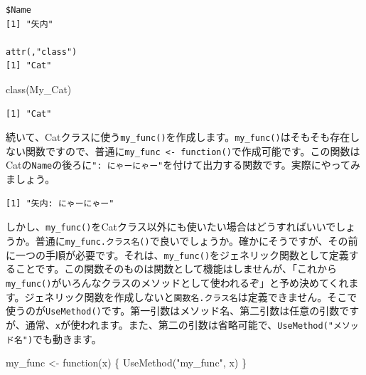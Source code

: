 \documentclass[
  a4paper,
  pandoc,
  ja=standard,
  jafont=haranoaji]{bxjsbook}
\newenvironment{Shaded}{\begin{snugshade}}{\end{snugshade}}
\newcommand{\ControlFlowTok}[1]{\textcolor[rgb]{0.00,0.48,0.65}{#1}}
\newcommand{\FunctionTok}[1]{\textcolor[rgb]{0.28,0.35,0.67}{#1}}
\newcommand{\NormalTok}[1]{\textcolor[rgb]{0.00,0.48,0.65}{#1}}
\newcommand{\OtherTok}[1]{\textcolor[rgb]{0.00,0.48,0.65}{#1}}
\newcommand{\SpecialCharTok}[1]{\textcolor[rgb]{0.37,0.37,0.37}{#1}}
\newcommand{\StringTok}[1]{\textcolor[rgb]{0.13,0.47,0.30}{#1}}
\begin{document}
\begin{verbatim}
$Name
[1] "矢内"

attr(,"class")
[1] "Cat"
\end{verbatim}

\begin{Shaded}
\begin{Highlighting}[numbers=left,,]
\FunctionTok{class}\NormalTok{(My\_Cat)}
\end{Highlighting}
\end{Shaded}

\begin{verbatim}
[1] "Cat"
\end{verbatim}

続いて、Catクラスに使う\texttt{my\_func()}を作成します。\texttt{my\_func()}はそもそも存在しない関数ですので、普通に\texttt{my\_func\ \textless{}-\ function()}で作成可能です。この関数はCatの\texttt{Name}の後ろに\texttt{":\ にゃーにゃー"}を付けて出力する関数です。実際にやってみましょう。

\begin{Shaded}
\end{Shaded}

\begin{verbatim}
[1] "矢内: にゃーにゃー"
\end{verbatim}

しかし、\texttt{my\_func()}をCatクラス以外にも使いたい場合はどうすればいいでしょうか。普通に\texttt{my\_func.クラス名()}で良いでしょうか。確かにそうですが、その前に一つの手順が必要です。それは、\texttt{my\_func()}をジェネリック関数として定義することです。この関数そのものは関数として機能はしませんが、「これから\texttt{my\_func()}がいろんなクラスのメソッドとして使われるぞ」と予め決めてくれます。ジェネリック関数を作成しないと\texttt{関数名.クラス名}は定義できません。そこで使うのが\texttt{UseMethod()}です。第一引数はメソッド名、第二引数は任意の引数ですが、通常、\texttt{x}が使われます。また、第二の引数は省略可能で、\texttt{UseMethod("メソッド名")}でも動きます。

\begin{Shaded}
\begin{Highlighting}[numbers=left,,]
\NormalTok{my\_func }\OtherTok{\textless{}{-}} \ControlFlowTok{function}\NormalTok{(x) \{}
  \FunctionTok{UseMethod}\NormalTok{(}\StringTok{"my\_func"}\NormalTok{, x)}
\NormalTok{\}}
\end{Highlighting}
\end{Shaded}
\end{document}
